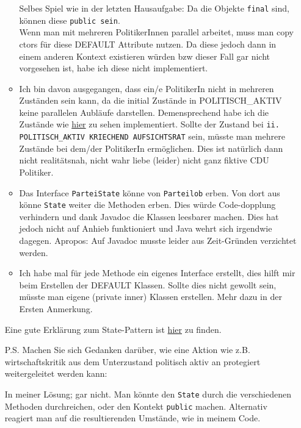 \documentclass{article}
\newcommand{\gqq}[1]{\glqq{}#1\grqq{}}
\begin{document}
\begin{enumerate}[label=\alph*.]
\begin{itemize}
                    Selbes Spiel wie in der letzten Hausaufgabe: Da die Objekte \texttt{final} sind, können diese \texttt{public sein}.\\
                    Wenn man mit mehreren PolitikerInnen parallel arbeitet, muss man copy ctors für diese DEFAULT Attribute nutzen.
                    Da diese jedoch dann in einem anderen Kontext existieren würden bzw dieser Fall gar nicht vorgesehen ist, habe ich diese nicht implementiert.

                \item Ich bin davon ausgegangen, dass ein/e PolitikerIn nicht in mehreren Zuständen sein kann, da die initial Zustände in POLITISCH\_AKTIV keine parallelen Aubläufe darstellen.
                    Demensprechend habe ich die Zustände wie \href{http://www.modeler.org.cn/tool/ToolsEA/UserGuide/model_simulation/multi-threading_-_concurrent_s.html}{hier} zu sehen implementiert.
                    Sollte der Zustand bei \texttt{ii. POLITISCH\_AKTIV KRIECHEND AUFSICHTSRAT} sein, müsste man mehrere Zustände bei dem/der PolitikerIn ermöglichen.
                    Dies ist natürlich dann nicht realitätsnah, nicht wahr liebe (leider) nicht ganz fiktive CDU Politiker.

                \item Das Interface \texttt{ParteiState} könne von \texttt{Parteilob} erben.
                    Von dort aus könne \texttt{State} weiter die Methoden erben.
                    Dies würde Code-dopplung verhindern und dank Javadoc die Klassen leesbarer machen.
                    Dies hat jedoch nicht auf Anhieb funktioniert und Java wehrt sich irgendwie dagegen.
                    Apropos: Auf Javadoc musste leider aus Zeit-Gründen verzichtet werden.

                \item Ich habe mal für jede Methode ein eigenes Interface erstellt, dies hilft mir beim Erstellen der DEFAULT Klassen.
                    Sollte dies nicht gewollt sein, müsste man eigene (private inner) Klassen erstellen.
                    Mehr dazu in der Ersten Anmerkung. 
            \end{itemize}
            
            Eine gute Erklärung zum State-Pattern ist \href{https://www.philipphauer.de/study/se/design-pattern/state.php}{hier} zu finden.

            P.S. Machen Sie sich Gedanken darüber, wie eine Aktion wie z.B. \gqq{wirtschaftskritik} aus dem Unterzustand \gqq{politisch aktiv} an protegiert weitergeleitet werden kann:

            In meiner Lösung; gar nicht.
            Man könnte den \texttt{State} durch die verschiedenen Methoden durchreichen, oder den Kontekt \texttt{public} machen.
            Alternativ reagiert man auf die resultierenden Umstände, wie in meinem Code.
    \end{enumerate}
\end{document}
